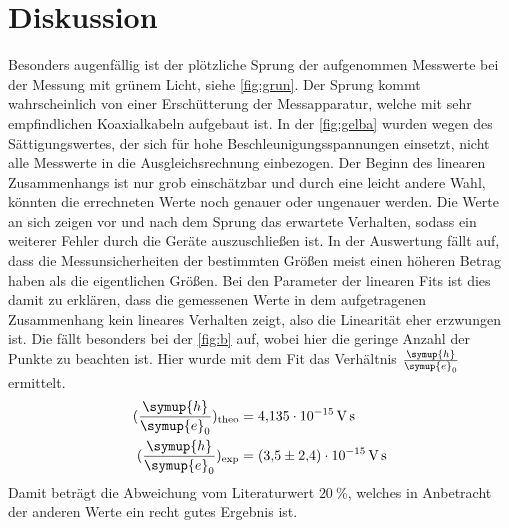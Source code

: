 \section{Diskussion}
\label{sec:Diskussion}
Besonders augenfällig ist der plötzliche Sprung der aufgenommen Messwerte bei der Messung mit grünem Licht, siehe \autoref{fig:grun}.
Der Sprung kommt wahrscheinlich von einer Erschütterung der Messapparatur, welche mit sehr empfindlichen Koaxialkabeln aufgebaut ist.
In der \autoref{fig:gelba} wurden wegen des Sättigungswertes, der sich für hohe Beschleunigungsspannungen einsetzt, nicht alle Messwerte in die Ausgleichsrechnung einbezogen.
Der Beginn des linearen Zusammenhangs ist nur grob einschätzbar und durch eine leicht andere Wahl, könnten die errechneten Werte noch genauer oder ungenauer werden.
Die Werte an sich zeigen vor und nach dem Sprung das erwartete Verhalten, sodass ein weiterer Fehler durch die Geräte auszuschließen ist.
In der Auswertung fällt auf, dass die Messunsicherheiten der bestimmten Größen meist einen höheren Betrag haben als die eigentlichen Größen. 
Bei den Parameter der linearen Fits ist dies damit zu erklären, dass die gemessenen Werte in dem aufgetragenen Zusammenhang kein lineares Verhalten zeigt, also die Linearität eher erzwungen ist.
Die fällt besonders bei der \autoref{fig:b} auf, wobei hier die geringe Anzahl der Punkte zu beachten ist. 
Hier wurde mit dem Fit das Verhältnis $\frac{\symup{h}}{\symup{e}_0}$ ermittelt. 
\begin{align*}
    (\frac{\symup{h}}{\symup{e}_0})_{\text{theo}} &= \SI{4.135e-15}{\volt\second}\\
    (\frac{\symup{h}}{\symup{e}_0})_{\text{exp}} &= \SI{3.5(24)e-15}{\volt\second}
\end{align*} 
Damit beträgt die Abweichung vom Literaturwert $\SI{20}{\percent}$, welches in Anbetracht der anderen Werte ein recht gutes Ergebnis ist.

